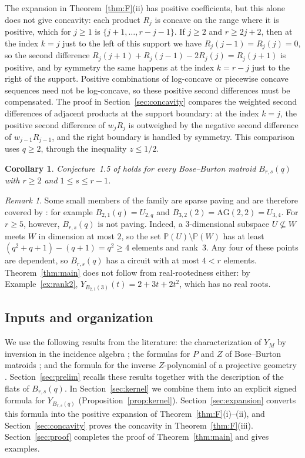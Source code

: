\documentclass{amsart}
\newtheorem{corollary}[theorem]{Corollary}
\theoremstyle{remark}
\newtheorem{remark}[theorem]{Remark}
\numberwithin{equation}{section}
\newcommand{\PP}{\mathbb{P}}
\newcommand{\AG}{\mathrm{AG}}
\begin{document}
The expansion in Theorem~\ref{thm:F}(ii) has positive coefficients, but this alone does not give concavity: each product $R_j$ is concave on the range where it is positive, which for $j\ge1$ is $\{j+1,\dots,r-j-1\}$. If $j\ge2$ and $r\ge2j+2$, then at the index $k=j$ just to the left of this support we have $R_j(j-1)=R_j(j)=0$, so the second difference $R_j(j+1)+R_j(j-1)-2R_j(j)=R_j(j+1)$ is positive, and by symmetry the same happens at the index $k=r-j$ just to the right of the support. Positive combinations of log-concave or piecewise concave sequences need not be log-concave, so these positive second differences must be compensated. The proof in Section~\ref{sec:concavity} compares the weighted second differences of adjacent products at the support boundary: at the index $k=j$, the positive second difference of $w_jR_j$ is outweighed by the negative second difference of $w_{j-1}R_{j-1}$, and the right boundary is handled by symmetry. This comparison uses $q\ge2$, through the inequality $z\le 1/2$.

\begin{corollary}\label{cor:conj}
Conjecture~1.5 of \cite{GRX} holds for every Bose--Burton matroid $B_{r,s}(q)$ with $r\ge 2$ and $1\le s\le r-1$.
\end{corollary}

\begin{remark}\label{rem:scope}
Some small members of the family are sparse paving and are therefore covered by \cite[Theorem~1.6]{GRX}: for example $B_{2,1}(q)=U_{2,q}$ and $B_{3,2}(2)=\AG(2,2)=U_{3,4}$. For $r\ge 5$, however, $B_{r,s}(q)$ is not paving. Indeed, a $3$-dimensional subspace $U\not\subseteq W$ meets $W$ in dimension at most $2$, so the set $\PP(U)\setminus\PP(W)$ has at least $(q^2+q+1)-(q+1)=q^2\ge4$ elements and rank~$3$. Any four of these points are dependent, so $B_{r,s}(q)$ has a circuit with at most $4<r$ elements. Theorem~\ref{thm:main} does not follow from real-rootedness either: by Example~\ref{ex:rank2}, $Y_{B_{2,1}(3)}(t)=2+3t+2t^2$, which has no real roots.
\end{remark}

\subsection*{Inputs and organization}
We use the following results from the literature: the characterization of $Y_M$ by inversion in the incidence algebra \cite[Section~2.2]{BFMN}; the formulas for $P$ and $Z$ of Bose--Burton matroids \cite[Remark~2.7]{CL}; and the formula for the inverse $Z$-polynomial of a projective geometry \cite[Proposition~3.8]{GLX}. Section~\ref{sec:prelim} recalls these results together with the description of the flats of $B_{r,s}(q)$. In Section~\ref{sec:kernel} we combine them into an explicit signed formula for $Y_{B_{r,s}(q)}$ (Proposition~\ref{prop:kernel}). Section~\ref{sec:expansion} converts this formula into the positive expansion of Theorem~\ref{thm:F}(i)--(ii), and Section~\ref{sec:concavity} proves the concavity in Theorem~\ref{thm:F}(iii). Section~\ref{sec:proof} completes the proof of Theorem~\ref{thm:main} and gives examples.
\end{document}
